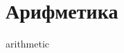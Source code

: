 \documentclass[10pt, a4paper]{article}
\begin{document}
\lhead{\leftmark} 
\part{Арифметика}
{arithmetic}
\end{document}
